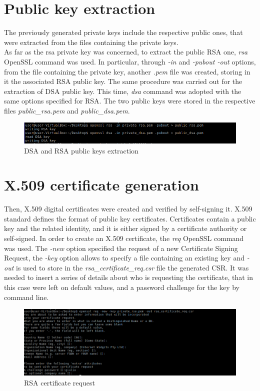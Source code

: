 \documentclass[11pt]{article}
\begin{document}
\section{Public key extraction}
The previously generated private keys include the respective public ones, that were extracted from the files containing the private keys. \\
As far as the rsa private key was concerned, to extract the public RSA one, \textit{rsa} OpenSSL command was used. In particular, through \textit{-in} and \textit{-pubout -out} options, from the file containing the private key, another \textit{.pem} file was created, storing in it the associated RSA public key.
The same procedure was carried out for the extraction of DSA public key. This time, \textit{dsa} command was adopted with the same options specified for RSA. The two public keys were stored in the respective files \textit{public\_rsa.pem} and \textit{public\_dsa.pem}.

\begin{figure}[H]
	\includegraphics[width=1\textwidth]{img3-hw6-1743261.png}
	\caption{DSA and RSA public keys extraction}
\end{figure}

\section{X.509 certificate generation}
Then, X.509 digital certificates were created and verified by self-signing it. X.509 standard defines the format of public key certificates. Certificates contain a public key and the related identity, and it is either signed by a certificate authority or self-signed. 
In order to create an X.509 certificate, the \textit{req} OpenSSL command was used. The \textit{-new} option specified the request of a new Certificate Signing Request, the \textit{-key} option allows to specify a file containing an existing key and \textit{-out} is used to store in the \textit{rsa\_certificate\_req.csr} file the generated CSR. It was needed to insert a series of details about who is requesting the certificate, that in this case were left on default values, and a password challenge for the key by command line.

\begin{figure}[H]
	\includegraphics[width=1\textwidth]{img4-hw6-1743261.png}
	\caption{RSA certificate request}
\end{figure}
\end{document}
